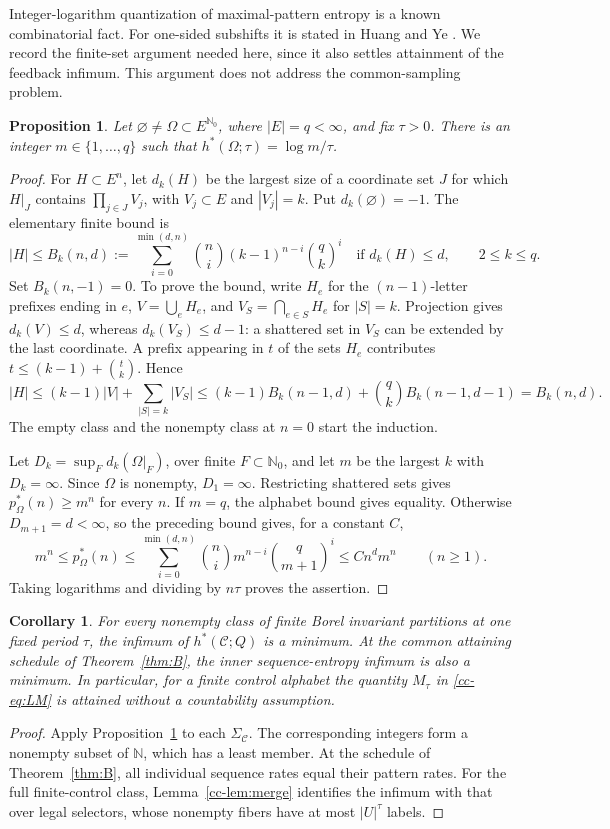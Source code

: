 \documentclass[11pt,reqno]{amsart}
\numberwithin{equation}{section}
\newtheorem{proposition}[theorem]{Proposition}
\newtheorem{corollary}[theorem]{Corollary}
\theoremstyle{definition}
\theoremstyle{definition}
\newcommand{\N}{\mathbb N}
\newcommand{\Nzero}{\mathbb N_0}
\newcommand{\C}{\mathcal C}
\newcommand{\hpat}{h^{*}}
\begin{document}
Integer-logarithm quantization of maximal-pattern entropy is a known
combinatorial fact. For one-sided subshifts it is stated in
Huang and Ye \cite[Theorem~5.5]{HuangYe2009}. We record the finite-set
argument needed here, since it also settles attainment of the feedback
infimum. This argument does not address the common-sampling problem.

\begin{proposition}\label{prop:quantization}
Let $\varnothing\ne\Omega\subset E^{\Nzero}$, where $|E|=q<\infty$,
and fix $\tau>0$. There is an integer $m\in\{1,\ldots,q\}$ such that
$\hpat(\Omega;\tau)=\log m/\tau$.
\end{proposition}
\begin{proof}
For $H\subset E^n$, let $d_k(H)$ be the largest size of a coordinate
set $J$ for which $H|_J$ contains $\prod_{j\in J}V_j$, with
$V_j\subset E$ and $|V_j|=k$. Put $d_k(\varnothing)=-1$.
The elementary finite bound is
\[
 |H|\le B_k(n,d):=
 \sum_{i=0}^{\min(d,n)}\binom ni(k-1)^{n-i}\binom qk^i
 \quad\text{if }d_k(H)\le d,\qquad 2\le k\le q.
\]
Set $B_k(n,-1)=0$. To prove the bound, write $H_e$ for the
$(n-1)$-letter prefixes ending in $e$, $V=\bigcup_eH_e$, and
$V_S=\bigcap_{e\in S}H_e$ for $|S|=k$. Projection gives
$d_k(V)\le d$, whereas $d_k(V_S)\le d-1$: a shattered set in
$V_S$ can be extended by the last coordinate. A prefix appearing
in $t$ of the sets $H_e$ contributes
$t\le(k-1)+\binom tk$. Hence
\[
 |H|\le(k-1)|V|+\sum_{|S|=k}|V_S|
 \le(k-1)B_k(n-1,d)+\binom qk B_k(n-1,d-1)
 =B_k(n,d).
\]
The empty class and the nonempty class at $n=0$ start the induction.

Let $D_k=\sup_Fd_k(\Omega|_F)$, over finite $F\subset\Nzero$,
and let $m$ be the largest $k$ with $D_k=\infty$.
Since $\Omega$ is nonempty, $D_1=\infty$.
Restricting shattered sets gives $p_\Omega^*(n)\ge m^n$ for every
$n$. If $m=q$, the alphabet bound gives equality. Otherwise
$D_{m+1}=d<\infty$, so the preceding bound gives, for a constant $C$,
\[
 m^n\le p_\Omega^*(n)
 \le\sum_{i=0}^{\min(d,n)}\binom ni m^{n-i}\binom q{m+1}^i
 \le C n^d m^n\qquad(n\ge1).
\]
Taking logarithms and dividing by $n\tau$ proves the assertion.
\end{proof}

\begin{corollary}\label{cor:pattern-minimum}
For every nonempty class of finite Borel invariant partitions at
one fixed period $\tau$, the infimum of $\hpat(\C;Q)$ is a minimum.
At the common attaining schedule of Theorem~\ref{thm:B}, the inner
sequence-entropy infimum is also a minimum. In particular, for a
finite control alphabet the quantity $M_\tau$ in
\eqref{cc-eq:LM} is attained without a countability assumption.
\end{corollary}
\begin{proof}
Apply Proposition~\ref{prop:quantization} to each $\Sigma_\C$.
The corresponding integers form a nonempty subset of $\N$, which
has a least member. At the schedule of Theorem~\ref{thm:B}, all
individual sequence rates equal their pattern rates.
For the full finite-control class, Lemma~\ref{cc-lem:merge}
identifies the infimum with that over legal selectors, whose
nonempty fibers have at most $|U|^\tau$ labels.
\end{proof}
\end{document}
